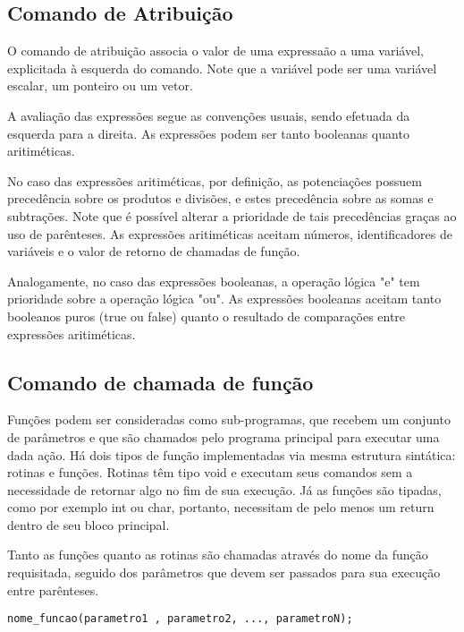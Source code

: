   \subsection{Comando de Atribuição}
                             
  O comando de atribuição associa o valor de uma expressaão a uma variável, explicitada à esquerda do comando. Note que a variável pode ser uma variável escalar, um ponteiro ou um vetor. 

  A avaliação das expressões segue as convenções usuais, sendo efetuada da esquerda para a direita. As expressões podem ser tanto booleanas quanto aritiméticas.

  No caso das expressões aritiméticas, por definição, as potenciações possuem precedência sobre os produtos e divisões, e estes precedência sobre as somas e subtrações. Note que é possível alterar a prioridade de tais precedências graças ao uso de parênteses. As expressões aritiméticas aceitam números, identificadores de variáveis e o valor de retorno de chamadas de função.

  Analogamente, no caso das expressões booleanas, a operação lógica "e" tem prioridade sobre a operação lógica "ou". As expressões booleanas aceitam tanto booleanos puros (true ou false) quanto o resultado de comparações entre expressões aritiméticas.

  \subsection{Comando de chamada de função}
                             
  Funções podem ser consideradas como sub-programas, que recebem um conjunto de parâmetros e que são chamados pelo programa principal para executar uma dada ação. Há dois tipos de função implementadas via mesma estrutura sintática: rotinas e funções. Rotinas têm tipo void e executam seus comandos sem a necessidade de retornar algo no fim de sua execução. Já as funções são tipadas, como por exemplo int ou char, portanto, necessitam de pelo menos um return dentro de seu bloco principal.

  Tanto as funções quanto as rotinas são chamadas através do nome da função requisitada, seguido dos parâmetros que devem ser passados para sua execução entre parênteses. 

\begin{lstlisting}
nome_funcao(parametro1 , parametro2, ..., parametroN);
\end{lstlisting}

